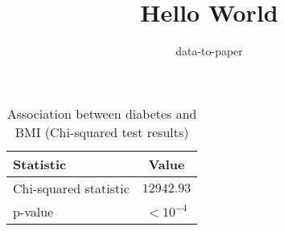 \documentclass[12pt]{article}
\title{Hello World}
\author{data-to-paper}
\begin{document}
\maketitle

\begin{table}[ht]
\centering
\caption{Association between diabetes and BMI (Chi-squared test results)}
\label{table:chi_squared_test}
\begin{tabular}{lc}
\toprule
Statistic & Value \\
\midrule
Chi-squared statistic & $12942.93$  \\
p-value & $<10^{-4}$ \\
\bottomrule
\end{tabular}
\end{table}
\end{document}
